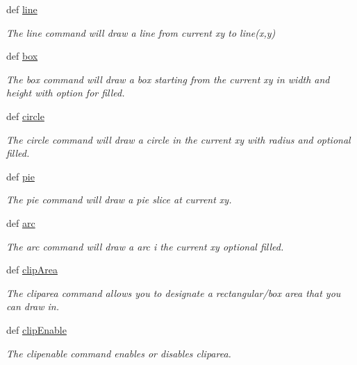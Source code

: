 \begin{DoxyCompactItemize}
def \hyperlink{group___drawing_gae70c22a0a810a70a0dd6d32c9fd7c066}{line}
\begin{DoxyCompactList}\small\item\em The line command will draw a line from current xy to line(x,y) \end{DoxyCompactList}\item 
def \hyperlink{group___drawing_ga63bb01e1f5ef0fe2ae2acec0ed90e5bd}{box}
\begin{DoxyCompactList}\small\item\em The box command will draw a box starting from the current xy in width and height with option for filled. \end{DoxyCompactList}\item 
def \hyperlink{group___drawing_gabfcfb31f2d88c7397332abcc6b324c7c}{circle}
\begin{DoxyCompactList}\small\item\em The circle command will draw a circle in the current xy with radius and optional filled. \end{DoxyCompactList}\item 
def \hyperlink{group___drawing_ga12fb93d2d6f7ce3f08ad988c09624d57}{pie}
\begin{DoxyCompactList}\small\item\em The pie command will draw a pie slice at current xy. \end{DoxyCompactList}\item 
def \hyperlink{group___drawing_ga13a0a8fb9c906a687f2a42864d973cc1}{arc}
\begin{DoxyCompactList}\small\item\em The arc command will draw a arc i the current xy optional filled. \end{DoxyCompactList}\item 
def \hyperlink{group___drawing_ga2f55674143f1e4b06e42f09aaf0da71c}{clip\-Area}
\begin{DoxyCompactList}\small\item\em The cliparea command allows you to designate a rectangular/box area that you can draw in. \end{DoxyCompactList}\item 
def \hyperlink{group___drawing_gabd1433160288289495e6c006e77951e6}{clip\-Enable}
\begin{DoxyCompactList}\small\item\em The clipenable command enables or disables cliparea. \end{DoxyCompactList}\item 

\end{DoxyCompactItemize}
